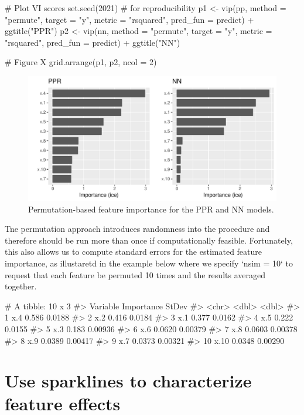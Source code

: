 \begin{example}
# Plot VI scores
set.seed(2021)  # for reproducibility
p1 <- vip(pp, method = "permute", target = "y", metric = "rsquared",
          pred_fun = predict) + ggtitle("PPR")
p2 <- vip(nn, method = "permute", target = "y", metric = "rsquared",
          pred_fun = predict) + ggtitle("NN")

# Figure X
grid.arrange(p1, p2, ncol = 2)
\end{example}

\begin{figure}[!htb]
  \centering 
  \includegraphics[width=1\linewidth]{figures/vip-ice-ppr-nn} 
  \caption{Permutation-based feature importance for the PPR and NN models.}
  \label{fig:vip-permute-ppr-nn}
\end{figure}

Tne permutation approach introduces randomness into the procedure and therefore should be run more than once if computationally feasible. Fortunately, this also allows us to compute standard errors for the estimated feature importance, as illustaretd in the example below where we specify `nsim = 10` to request that each feature be permuted 10 times and the results averaged together.

\begin{example}
# A tibble: 10 x 3
#>    Variable Importance   StDev
#>    <chr>         <dbl>   <dbl>
#>  1 x.4          0.586  0.0188 
#>  2 x.2          0.416  0.0184 
#>  3 x.1          0.377  0.0162 
#>  4 x.5          0.222  0.0155 
#>  5 x.3          0.183  0.00936
#>  6 x.6          0.0620 0.00379
#>  7 x.8          0.0603 0.00378
#>  8 x.9          0.0389 0.00417
#>  9 x.7          0.0373 0.00321
#> 10 x.10         0.0348 0.00290
\end{example}


\section{Use sparklines to characterize feature effects}

